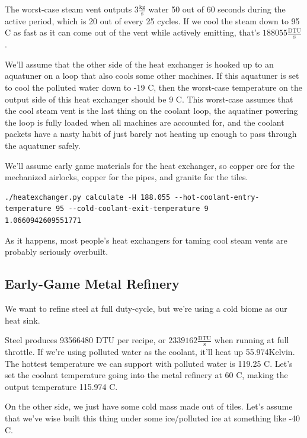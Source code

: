\documentclass{article}
\numberwithin{equation}{subsection}
\theoremstyle{remark}
\begin{document}
The worst-case steam vent outputs \(3 \frac{\mathrm{kg}}{\mathrm{s}}\) water 50 out of 60 seconds during the active period, which is 20 out of every 25 cycles.  If we cool the steam down to 95 \degree{}C as fast as it can come out of the vent while actively emitting, that's \(188055 \frac{\mathrm{DTU}}{\mathrm{s}}\).

We'll assume that the other side of the heat exchanger is hooked up to an aquatuner on a loop that also cools some other machines.
If this aquatuner is set to cool the polluted water down to -19 \degree{}C, then the worst-case temperature on the output side of this heat exchanger should be 9 \degree{}C.
This worst-case assumes that the cool steam vent is the last thing on the coolant loop, the aquatiner powering the loop is fully loaded when all machines are accounted for, and the coolant packets have a nasty habit of just barely not heating up enough to pass through the aquatuner safely.

We'll assume early game materials for the heat exchanger, so copper ore for the mechanized airlocks, copper for the pipes, and granite for the tiles.

\begin{verbatim}
./heatexchanger.py calculate -H 188.055 --hot-coolant-entry-temperature 95 --cold-coolant-exit-temperature 9
1.0660942609551771
\end{verbatim}

As it happens, most people's heat exchangers for taming cool steam vents are probably seriously overbuilt.

\subsection{Early-Game Metal Refinery}

We want to refine steel at full duty-cycle, but we're using a cold biome as our heat sink.

Steel produces 93566480 DTU per recipe, or \(2339162 \frac{\mathrm{DTU}}{\mathrm{s}}\) when running at full throttle.
If we're using polluted water as the coolant, it'll heat up 55.974Kelvin.
The hottest temperature we can support with polluted water is 119.25 \degree{}C.
Let's set the coolant temperature going into the metal refinery at 60 \degree{}C, making the output temperature 115.974 \degree{}C.

On the other side, we just have some cold mass made out of tiles.
Let's assume that we've wise built this thing under some ice/polluted ice at something like -40 \degree{}C.
\end{document}
